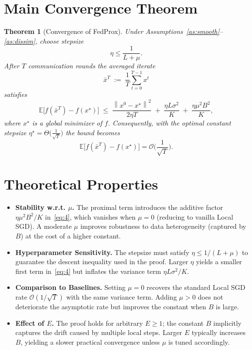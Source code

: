 \documentclass[11pt]{article}
\newtheorem{theorem}{Theorem}
\newcommand{\E}{\mathbb{E}}
\newcommand{\norm}[1]{\left\lVert #1\right\rVert}
\begin{document}
\section*{Main Convergence Theorem}
\begin{theorem}[Convergence of FedProx]\label{thm:main}
Under Assumptions~\ref{as:smooth}--\ref{as:dissim}, choose stepsize
\[
\eta\le\frac{1}{L+\mu}.
\]
After $T$ communication rounds the averaged iterate
\[
\bar x^{T}\;:=\;\frac{1}{T}\sum_{t=0}^{T-1}x^{t}
\]
satisfies
\[
\E\!\big[f(\bar x^{T})-f(x^{\star})\big]
\;\le\;
\frac{\norm{x^{0}-x^{\star}}^{2}}{2\eta T}
\;+\;
\frac{\eta L\sigma^{2}}{K}
\;+\;
\frac{\eta\mu^{2}B^{2}}{K},
\tag{4}
\]
where $x^{\star}$ is a global minimizer of $f$.  Consequently, with the optimal constant stepsize
$\eta^{\star}= \Theta\!\big(\frac{1}{\sqrt{T}}\big)$ the bound becomes
\[
\E\!\big[f(\bar x^{T})-f(x^{\star})\big]=\mathcal{O}\!\Big(\frac{1}{\sqrt{T}}\Big).
\]
\end{theorem}

\section*{Theoretical Properties}
\begin{itemize}[leftmargin=*]
\item \textbf{Stability w.r.t. $\mu$.} The proximal term introduces the additive factor $\eta\mu^{2}B^{2}/K$ in~\eqref{eq:4}, which vanishes when $\mu=0$ (reducing to vanilla Local SGD). A moderate $\mu$ improves robustness to data heterogeneity (captured by $B$) at the cost of a higher constant.
\item \textbf{Hyperparameter Sensitivity.} The stepsize must satisfy $\eta\le 1/(L+\mu)$ to guarantee the descent inequality used in the proof. Larger $\eta$ yields a smaller first term in~\eqref{eq:4} but inflates the variance term $\eta L\sigma^{2}/K$.
\item \textbf{Comparison to Baselines.} Setting $\mu=0$ recovers the standard Local SGD rate $\mathcal{O}(1/\sqrt{T})$ with the same variance term. Adding $\mu>0$ does not deteriorate the asymptotic rate but improves the constant when $B$ is large.
\item \textbf{Effect of $E$.} The proof holds for arbitrary $E\ge1$; the constant $B$ implicitly captures the drift caused by multiple local steps. Larger $E$ typically increases $B$, yielding a slower practical convergence unless $\mu$ is tuned accordingly.
\end{itemize}
\end{document}
